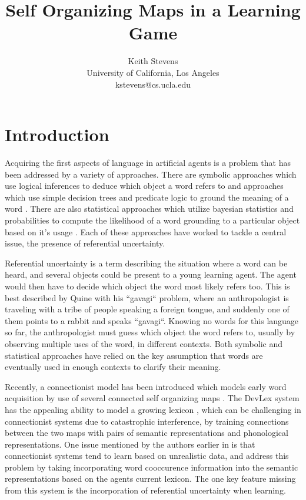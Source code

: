 \documentclass[a4paper,11pt]{article}
\title{Self Organizing Maps in a Learning Game}
\author{Keith Stevens \\ University of California, Los Angeles \\
kstevens@cs.ucla.edu}
\date{}
\begin{document}
\maketitle

\section{Introduction}
Acquiring the first aspects of language in artificial agents is a problem that
has been addressed by a variety of approaches.  There are symbolic approaches
which use logical inferences to deduce which object a word refers to
\cite{Siskind} and approaches which use simple decision trees and predicate
logic to ground the meaning of a word \cite{GoldNico}.  There are also
statistical approaches which utilize bayesian statistics  and probabilities to
compute the likelihood of a word grounding to a particular object based on it's
usage \cite{FazlyProbRefUn,SmithCommSystem,VogtSocial}.  Each of these
approaches have worked to tackle a central issue, the presence of referential
uncertainty.  

Referential uncertainty is a term describing the situation where a word can be
heard, and several objects could be present to a young learning agent.  The
agent would then have to decide which object the word most likely refers too.
This is best described by Quine \cite{Quine} with his ``gavagi`` problem, where
an anthropologist is traveling with a tribe of people speaking a foreign tongue,
and suddenly one of them points to a rabbit and speaks ``gavagi``.  Knowing no
words for this language so far, the anthropologist must guess which object the
word refers to, usually by observing multiple uses of the word, in different
contexts.  Both symbolic and statistical approaches have relied on the key
assumption that words are eventually used in enough contexts to clarify their
meaning.

Recently, a connectionist model has been introduced which models early word
acquisition by use of several connected self organizing maps
\cite{LiDevLex,MiikDisLex}.  The DevLex system has the appealing ability to
model a growing lexicon \cite{LiDevLex}, which can be challenging in
connectionist systems due to catastrophic interference, by training connections
between the two maps with pairs of semantic representations and phonological
representations.  One issue mentioned by the authors earlier in \cite{FarkasWcd}
is that connectionist systems tend to learn based on unrealistic data, and
address this problem by taking incorporating word cooccurence information into
the semantic representations based on the agents current lexicon.  The one key
feature missing from this system is the incorporation of referential uncertainty
when learning.
\end{document}
